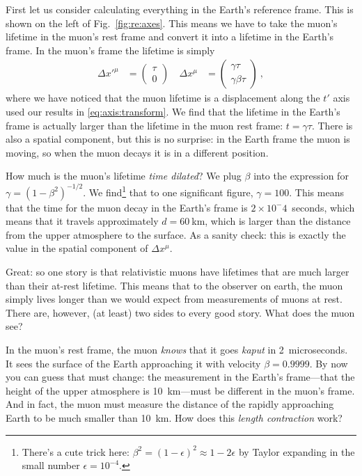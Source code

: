\documentclass[12pt]{article}
\begin{document}
First let us consider calculating everything in the Earth's reference frame. This is shown on the left of Fig.~\ref{fig:re:axes}. This means we have to take the muon's lifetime in the muon's rest frame and convert it into a lifetime in the Earth's frame. In the muon's frame the lifetime is simply 
\begin{align}
    \Delta x'^\mu &= 
    \begin{pmatrix}
    \tau \\ 0     
    \end{pmatrix} \ 
    &
    \Delta x^\mu &=
    \begin{pmatrix}
    \gamma \tau \\ \gamma\beta \tau    
    \end{pmatrix} \ ,
\end{align}
where we have noticed that the muon lifetime is a displacement along the $t'$ axis used our results in \eqref{eq:axis:transform}. We find that the lifetime in the Earth's frame is actually larger than the lifetime in the muon rest frame: $t = \gamma \tau$. There is also a spatial component, but this is no surprise: in the Earth frame the muon is moving, so when the muon decays it is in a different position. 

How much is the muon's lifetime \emph{time dilated}? We plug $\beta$ into the expression for $\gamma = (1-\beta^2)^{-1/2}$. We find\footnote{There's a cute trick here: $\beta^2 = (1-\epsilon)^2 \approx 1- 2\epsilon$ by Taylor expanding in the small number $\epsilon = 10^{-4}$.} that to one significant figure, $\gamma = 100$. This means that the time for the muon decay in the Earth's frame is $2\times 10^-4$~seconds, which means that it travels approximately $d=60~$km, which is larger than the distance from the upper atmosphere to the surface. As a sanity check: this is exactly the value in the spatial component of $\Delta x^\mu$.

Great: so one story is that relativistic muons have lifetimes that are much larger than their at-rest lifetime. This means that to the observer on earth, the muon simply lives longer than we would expect from measurements of muons at rest. There are, however, (at least) two sides to every good story. What does the muon see?

In the muon's rest frame, the muon \emph{knows} that it goes \emph{kaput} in 2~microseconds. It sees the surface of the Earth approaching it with velocity $\beta = 0.9999$. By now you can guess that must change: the measurement in the Earth's frame---that the height of the upper atmosphere is 10~km---must be different in the muon's frame. And in fact, the muon must measure the distance of the rapidly approaching Earth to be much smaller than 10~km. How does this \emph{length contraction} work? 
\end{document}
